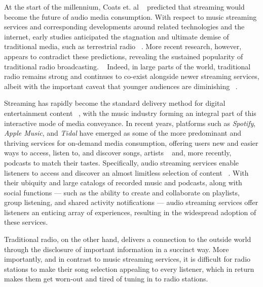 \cleardoublepage
\label{chap:intro}
At the start of the millennium, Coats et. al ~\cite{Coats2000} predicted that streaming would become the future of audio media consumption. With respect to music streaming services and corresponding developments around related technologies and the internet, early studies anticipated the stagnation and ultimate demise of traditional media, such as terrestrial radio ~\cite{Ala-Fossi2008}. More recent research, however, appears to contradict these predictions, revealing the sustained popularity of traditional radio broadcasting. ~\cite{DangNguyen2012, Waits2007} Indeed, in large parts of the world, traditional radio remains strong and continues to co-exist alongside newer streaming services, albeit with the important caveat that younger audiences are diminishing ~\cite{Albarran2007}. 

Streaming has rapidly become the standard delivery method for digital entertainment content ~\cite{Swaminathan2013}, with the music industry forming an integral part of this interactive mode of media conveyance. In recent years, platforms such as \textit{Spotify}, \textit{Apple Music}, and \textit{Tidal} have emerged as some of the more predominant and thriving services for on-demand media consumption, offering users new and easier ways to access, listen to, and discover songs, artists ~\cite{Weijters2014} and, more recently, podcasts to match their tastes. Specifically, audio streaming services enable listeners to access and discover an almost limitless selection of content ~\cite{Morris2015}. With their ubiquity and large catalogs of recorded music and podcasts, along with social functions — such as the ability to create and collaborate on playlists, group listening, and shared activity notifications — audio streaming services offer listeners an enticing array of experiences, resulting in the widespread adoption of these services. ~\cite{Mantymaki2015}

Traditional radio, on the other hand, delivers a connection to the outside world through the disclosure of important information in a succinct way. More importantly, and in contrast to music streaming services, it is difficult for radio stations to make their song selection appealing to every listener, which in return makes them get worn-out and tired of tuning in to radio stations. 

